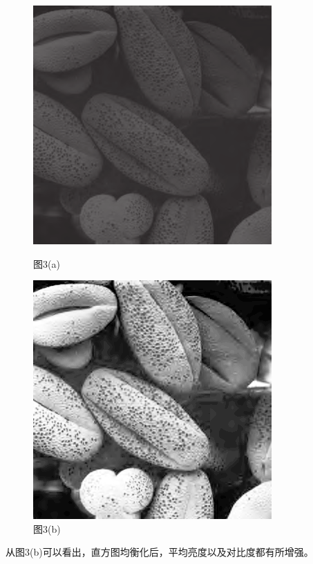 \documentclass[notheorems,serif,table,compress]{beamer}  %
\begin{document}
 \begin{figure}
        \begin{minipage}[t]{0.4\linewidth}
        \centering
        \includegraphics[width=1\linewidth]{huafen_a.png} 
        \caption{图3(a)}
        \end{minipage}
        \begin{minipage}[t]{0.4\linewidth}
        \centering
        \includegraphics[width=1\linewidth]{huafen_c.png} 
          \caption{图3(b)}
        \end{minipage}
    \end{figure}
从图3(b)可以看出，直方图均衡化后，平均亮度以及对比度都有所增强。
\end{document}
